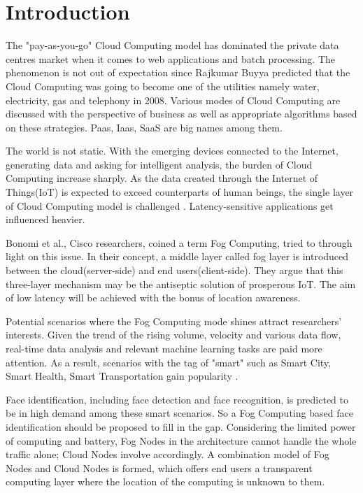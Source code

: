 \chapter{Introduction}
The "pay-as-you-go" Cloud Computing model has dominated the private data centres market when it comes to web applications and batch processing\cite{bonomi2012fog}. The phenomenon is not out of expectation since Rajkumar Buyya predicted that the Cloud Computing was going to become one of the utilities namely water, electricity, gas and telephony in 2008\cite{buyya2009cloud}. Various modes of Cloud Computing are discussed with the perspective of business as well as appropriate algorithms based on these strategies. Paas, Iaas, SaaS are big names among them.

The world is not static. With the emerging devices connected to the Internet, generating data and asking for intelligent analysis, the burden of Cloud Computing increase sharply. As the data created through the Internet of Things(IoT) is expected to exceed counterparts of human beings, the single layer of Cloud Computing model is challenged \cite{vaquero2014finding}. Latency-sensitive applications get influenced heavier.

Bonomi et al., Cisco researchers, coined a term Fog Computing, tried to through light on this issue. In their concept, a middle layer called fog layer is introduced between the cloud(server-side) and end users(client-side). They argue that this three-layer mechanism may be the antiseptic solution of prosperous IoT. The aim of low latency will be achieved with the bonus of location awareness.

Potential scenarios where the Fog Computing mode shines attract researchers' interests. Given the trend of the rising volume, velocity and various data flow, real-time data analysis and relevant machine learning tasks are paid more attention. As a result, scenarios with the tag of "smart" such as Smart City, Smart Health, Smart Transportation gain popularity \cite{madsen2013reliability}.

Face identification, including face detection and face recognition, is predicted to be in high demand among these smart scenarios. So a Fog Computing based face identification should be proposed to fill in the gap. Considering the limited power of computing and battery, Fog Nodes in the architecture cannot handle the whole traffic alone; Cloud Nodes involve accordingly. A combination model of Fog Nodes and Cloud Nodes is formed, which offers end users a transparent computing layer where the location of the computing is unknown to them.
